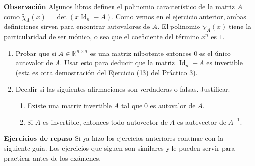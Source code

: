 \documentclass[a4paper,12pt,twoside,spanish,reqno]{amsbook}
\numberwithin{equation}{section}
\begin{document}
\textbf{Observación} Algunos libros definen el polinomio característico de la matriz $A$ como $\tilde\chi_A(x)=\det(x\operatorname{Id}_n-A)$. Como vemos en el ejercicio anterior, ambas definiciones sirven para encontrar autovalores de $A$. El polinomio $\tilde\chi_A(x)$ tiene la particularidad de ser mónico, o sea que el coeficiente del término $x^n$ es $1$.

\begin{enumerate}[resume,topsep=6pt,itemsep=.4cm]

\item Probar que si $A\in\mathbb{K}^{n\times n}$ es una matriz nilpotente entonces $0$ es el único autovalor de $A$. Usar esto para deducir que la matriz $\operatorname{Id}_n-A$ es invertible (esta es otra demostración del Ejercicio (13) del Práctico 3).


\item Decidir si las siguientes afirmaciones son verdaderas o falsas. Justificar.

\begin{enumerate}
	\item Existe una matriz invertible $A$ tal que $0$ es autovalor de $A$.
	\item  Si $A$ es invertible, entonces todo autovector de $A$ es autovector de $A^{-1}$.
\end{enumerate}

\end{enumerate}

\textbf{Ejercicios de repaso}
Si ya hizo los ejercicios anteriores continue con la siguiente guía. Los ejercicios que siguen son similares y le pueden servir para practicar antes de los exámenes.
\end{document}
